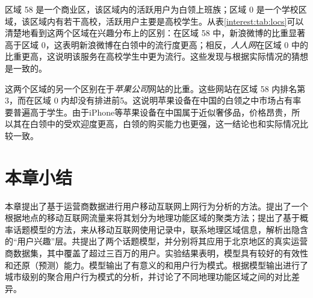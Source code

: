 区域 58 是一个商业区，该区域内的活跃用户为白领上班族；区域 0 是一个学校区域，该区域内有若干高校，活跃用户主要是高校学生。从表\ref{interest:tab:locs}可以清楚地看到这两个区域在兴趣分布上的区别：在区域 58 中，新浪微博的比重显著高于区域 0，这表明新浪微博在白领中的流行度更高；相反，\textit{人人网}在区域 0 中的比重更高，这说明该服务在高校学生中更为流行。这些发现与根据实际情况的猜想是一致的。

这两个区域的另一个区别在于\textit{苹果公司}网站的比重。这些网站在区域 58 内排名第3，而在区域 0 内却没有排进前5。这说明苹果设备在中国的白领之中市场占有率要普遍高于学生。由于iPhone等苹果设备在中国属于近似奢侈品，价格昂贵，所以其在白领中的受欢迎度更高，白领的购买能力也更强，这一结论也和实际情况比较一致。

\section{本章小结}
\label{interest:sec:conclusion}
本章提出了基于运营商数据进行用户移动互联网上网行为分析的方法。提出了一个根据地点的移动互联网流量来将其划分为地理功能区域的聚类方法；提出了基于概率话题模型的方法，来从移动互联网使用记录中，联系地理区域信息，解析出隐含的``用户兴趣''层。共提出了两个话题模型，并分别将其应用于北京地区的真实运营商数据集，其中覆盖了超过三百万的用户。实验结果表明，模型具有较好的有效性和还原（预测）能力。模型输出了有意义的和用户行为模式。根据模型输出进行了城市级别的聚合用户行为模式的分析，并讨论了不同地理功能区域之间的对比差异。

